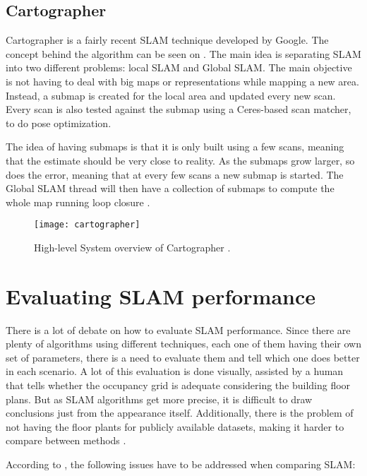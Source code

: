 \subsection{Cartographer}

Cartographer is a fairly recent SLAM technique developed by Google. The concept behind the algorithm can be seen on . The main idea is separating SLAM into two different problems: local SLAM and Global SLAM. The main objective is not having to deal with big maps or representations while mapping a new area. Instead, a submap is created for the local area and updated every new scan. Every scan is also tested against the submap using a Ceres-based scan matcher, to do pose optimization.

The idea of having submaps is that it is only built using a few scans, meaning that the estimate should be very close to reality. As the submaps grow larger, so does the error, meaning that at every few scans a new submap is started. The Global SLAM thread will then have a collection of submaps to compute the whole map running loop closure \cite{cartographer2016google}.

\begin{figure}[!ht]
    \centering
    \texttt{[image: cartographer]}
    \caption[High-level System overview of Cartographer.]{High-level System overview of Cartographer \cite{cartographerimage}.}
    \label{fig:cartographer}
\end{figure}

\section{Evaluating SLAM performance} \label{sec:evaluating}

There is a lot of debate on how to evaluate SLAM performance. Since there are plenty of algorithms using different techniques, each one of them having their own set of parameters, there is a need to evaluate them and tell which one does better in each scenario. A lot of this evaluation is done visually, assisted by a human that tells whether the occupancy grid is adequate considering the building floor plans. But as SLAM algorithms get more precise, it is difficult to draw conclusions just from the appearance itself. Additionally, there is the problem of not having the floor plants for publicly available datasets, making it harder to compare between methods \cite{kummerle2009measuring}.

According to \citeauthor{amigoni2007good}, the following issues have to be addressed when comparing SLAM:

